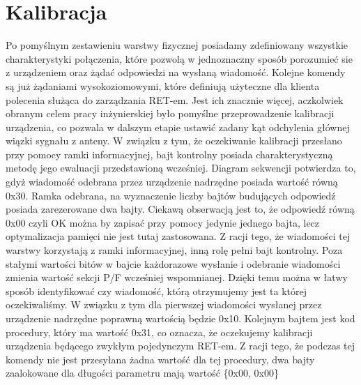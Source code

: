 \section{Kalibracja}
Po pomyślnym zestawieniu warstwy fizycznej posiadamy zdefiniowany wszystkie charakterystyki połączenia, 
które pozwolą w jednoznaczny sposób porozumieć sie z urządzeniem oraz żądać odpowiedzi na wysłaną wiadomość.
Kolejne komendy są już żądaniami wysokoziomowymi, które definiują użyteczne dla klienta polecenia służąca do zarządzania RET-em.
Jest ich znacznie więcej, aczkolwiek obranym celem pracy inżynierskiej było pomyślne przeprowadzenie kalibracji urządzenia, 
co pozwala w dalszym etapie ustawić zadany kąt odchylenia głównej wiązki sygnału z anteny.
W związku z tym, że oczekiwanie kalibracji przesłano przy pomocy ramki informacyjnej, bajt kontrolny posiada
charakterystyczną metodę jego ewaluacji przedstawioną wcześniej. Diagram sekwencji
potwierdza to, gdyż wiadomość odebrana przez urządzenie nadrzędne posiada wartość równą 0x30.
Ramka odebrana, na wyznaczenie liczby bajtów budujących odpowiedź posiada zarezerowane dwa bajty. 
Ciekawą obserwacją jest to, że odpowiedź równą 0x00 czyli OK można by zapisać przy pomocy jedynie jednego bajta, lecz optymalizacja
pamięci nie jest tutaj zastosowana.
\newline\newline
Z racji tego, że wiadomości tej warstwy korzystają z ramki informacyjnej, inną rolę pełni bajt kontrolny. Poza stałymi wartości bitów w bajcie 
każdorazowe wysłanie i odebranie wiadomości zmienia wartość sekcji P/F wcześniej wspomnianej. 
Dzięki temu można w łatwy sposób identyfikować czy wiadomość, którą otrzymujemy jest ta której oczekiwaliśmy. 
W związku z tym dla pierwszej wiadomości wysłanej przez urządzenie nadrzędne poprawną wartością będzie 0x10.
\newline
Kolejnym bajtem jest kod procedury, który ma wartość 0x31, co oznacza, że oczekujemy kalibracji urządzenia będącego zwykłym pojedynczym RET-em.
\newline
Z racji tego, że podczas tej komendy nie jest przesyłana żadna wartość dla tej procedury, dwa bajty zaalokowane dla długości parametru mają wartość \{0x00, 0x00\}
